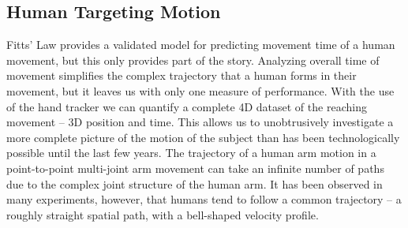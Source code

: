 \subsection{Human Targeting Motion}
\label{human-targeting-motion}
%
%
Fitts' Law provides a validated model for predicting movement time of a human movement, but this only provides part of the story.
Analyzing overall time of movement simplifies the complex trajectory that a human forms in their movement, but it leaves us with only one measure of performance.
With the use of the hand tracker we can quantify a complete 4D dataset of the reaching movement -- 3D position and time.
This allows us to unobtrusively investigate a more complete picture of the motion of the subject than has been technologically possible until the last few years.
The trajectory of a human arm motion in a point-to-point multi-joint arm movement can take an infinite number of paths due to the complex joint structure of the human arm.
It has been observed in many experiments, however, that humans tend to follow a common trajectory -- a roughly straight spatial path, with a bell-shaped velocity profile.
%
%
%
